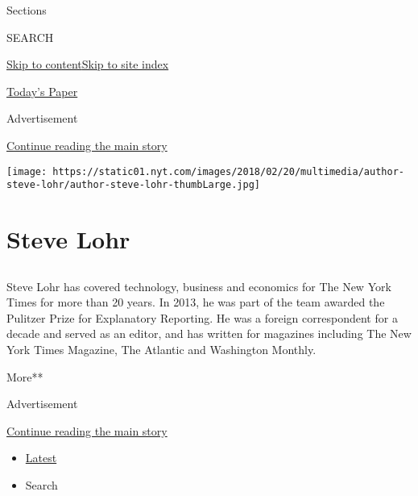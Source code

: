 Sections

SEARCH

\protect\hyperlink{site-content}{Skip to
content}\protect\hyperlink{site-index}{Skip to site index}

\href{https://myaccount.nytimes.com/auth/login?response_type=cookie\&client_id=vi}{}

\href{https://www.nytimes.com/section/todayspaper}{Today's Paper}

Advertisement

\protect\hyperlink{after-top}{Continue reading the main story}

\texttt{[image: https://static01.nyt.com/images/2018/02/20/multimedia/author-steve-lohr/author-steve-lohr-thumbLarge.jpg]}

\hypertarget{steve-lohr}{%
\section{Steve Lohr}\label{steve-lohr}}

\subsection{}

Steve Lohr has covered technology, business and economics for The New
York Times for more than 20 years. In 2013, he was part of the team
awarded the Pulitzer Prize for Explanatory Reporting. He was a foreign
correspondent for a decade and served as an editor, and has written for
magazines including The New York Times Magazine, The Atlantic and
Washington Monthly.

More**

Advertisement

\protect\hyperlink{after-mid1}{Continue reading the main story}

\begin{itemize}
\tightlist
\item
  \protect\hyperlink{stream-panel}{Latest}
\item
  Search
\end{itemize}

